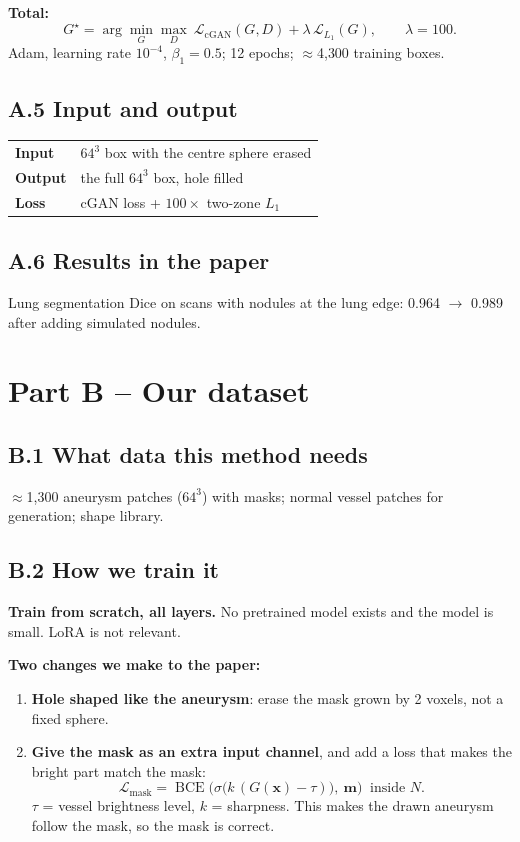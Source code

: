 \documentclass[11pt,a4paper,oneside]{report}
\newcommand{\m}{\bm{m}}
\newcommand{\Loss}{\mathcal{L}}
\begin{document}
\textbf{Total:}
\begin{equation}
G^\star = \arg\min_G\max_D\ \Loss_{\text{cGAN}}(G,D) + \lambda\,\Loss_{L_1}(G),\qquad \lambda=100.
\end{equation}
Adam, learning rate $10^{-4}$, $\beta_1=0.5$; 12 epochs; $\approx$4{,}300 training boxes.

\subsection*{A.5 Input and output}
\begin{center}
\small
\begin{tabularx}{\linewidth}{lX}
\toprule
\textbf{Input} & $64^3$ box with the centre sphere erased \\
\textbf{Output} & the full $64^3$ box, hole filled \\
\textbf{Loss} & cGAN loss + $100\times$ two-zone $L_1$ \\
\bottomrule
\end{tabularx}
\end{center}

\subsection*{A.6 Results in the paper}
Lung segmentation Dice on scans with nodules at the lung edge: 0.964 $\rightarrow$ 0.989 after adding simulated nodules.

\section{Part B -- Our dataset}

\subsection*{B.1 What data this method needs}
$\approx$1{,}300 aneurysm patches ($64^3$) with masks; normal vessel patches for generation; shape library.

\subsection*{B.2 How we train it}
\textbf{Train from scratch, all layers.} No pretrained model exists and the model is small. LoRA is not relevant.

\textbf{Two changes we make to the paper:}
\begin{enumerate}
  \item \textbf{Hole shaped like the aneurysm}: erase the mask grown by 2 voxels, not a fixed sphere.
  \item \textbf{Give the mask as an extra input channel}, and add a loss that makes the bright part match the mask:
  \begin{equation}
  \Loss_{\text{mask}} = \operatorname{BCE}\Big(\sigma\big(k\,(G(\bm x)-\tau)\big),\ \m\Big)\ \text{ inside } N .
  \end{equation}
  $\tau$ = vessel brightness level, $k$ = sharpness. This makes the drawn aneurysm follow the mask, so the mask is correct.
\end{enumerate}
\end{document}

